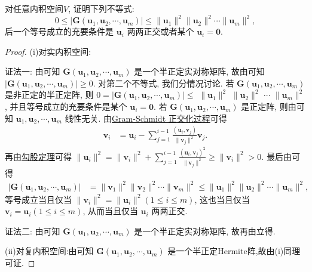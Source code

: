 \documentclass[../../main.tex]{subfiles}%
\begin{document}
\begin{proposition}\label{proposition:例9.16}
对任意内积空间$V$,
证明下列不等式:
\[
0 \leqslant  |\boldsymbol{G}(\boldsymbol{u}_1,\boldsymbol{u}_2,\cdots,\boldsymbol{u}_m)| \leqslant  \|\boldsymbol{u}_1\|^2\|\boldsymbol{u}_2\|^2\cdots\|\boldsymbol{u}_m\|^2,
\]
后一个等号成立的充要条件是 $\boldsymbol{u}_i$ 两两正交或者某个 $\boldsymbol{u}_i = \boldsymbol{0}$.
\end{proposition}
\begin{proof}
(i)对实内积空间:

{\color{blue}证法一:}
由可知 $\boldsymbol{G}(\boldsymbol{u}_1,\boldsymbol{u}_2,\cdots,\boldsymbol{u}_m)$ 是一个半正定实对称矩阵, 故由可知 $|\boldsymbol{G}(\boldsymbol{u}_1,\boldsymbol{u}_2,\cdots,\boldsymbol{u}_m)| \geqslant  0$. 对第二个不等式, 我们分情况讨论. 若 $\boldsymbol{G}(\boldsymbol{u}_1,\boldsymbol{u}_2,\cdots,\boldsymbol{u}_m)$ 是非正定的半正定阵, 则 $0 = |\boldsymbol{G}(\boldsymbol{u}_1,\boldsymbol{u}_2,\cdots,\boldsymbol{u}_m)| \leqslant $   $\|\boldsymbol{u}_1\|^2$  $\|\boldsymbol{u}_2\|^2$ $\cdots$ $\|\boldsymbol{u}_m\|^2$, 并且等号成立的充要条件是某个 $\boldsymbol{u}_i = \boldsymbol{0}$. 若 $\boldsymbol{G}(\boldsymbol{u}_1,\boldsymbol{u}_2,\cdots,\boldsymbol{u}_m)$ 是正定阵, 则由可知 $\boldsymbol{u}_1,\boldsymbol{u}_2,\cdots,\boldsymbol{u}_m$ 线性无关. 由\hyperref[theorem:Gram-Schmidt正交化方法]{Gram-Schmidt 正交化过程}可得
\begin{align*}
\boldsymbol{v}_i &= \boldsymbol{u}_i - \sum_{j = 1}^{i - 1} \frac{(\boldsymbol{u}_i,\boldsymbol{v}_j)}{\|\boldsymbol{v}_j\|^2} \boldsymbol{v}_j.
\end{align*}
再由\hyperref[corollary:范数性质的相关推广-勾股定理]{勾股定理}可得 $\|\boldsymbol{u}_i\|^2 = \|\boldsymbol{v}_i\|^2 + \sum_{j = 1}^{i - 1} \frac{(\boldsymbol{u}_i,\boldsymbol{v}_j)^2}{\|\boldsymbol{v}_j\|^2} \geqslant  \|\boldsymbol{v}_i\|^2 > 0$. 最后由可得
\begin{align*}
|\boldsymbol{G}(\boldsymbol{u}_1,\boldsymbol{u}_2,\cdots,\boldsymbol{u}_m)| &= \|\boldsymbol{v}_1\|^2\|\boldsymbol{v}_2\|^2\cdots\|\boldsymbol{v}_m\|^2 \leqslant  \|\boldsymbol{u}_1\|^2\|\boldsymbol{u}_2\|^2\cdots\|\boldsymbol{u}_m\|^2,
\end{align*}
等号成立当且仅当 $\|\boldsymbol{v}_i\|^2 = \|\boldsymbol{u}_i\|^2 (1 \leqslant  i \leqslant  m)$, 这也当且仅当 $\boldsymbol{v}_i = \boldsymbol{u}_i (1 \leqslant  i \leqslant  m)$, 从而当且仅当 $\boldsymbol{u}_i$ 两两正交.

{\color{blue}证法二:}
由可知 $\boldsymbol{G}(\boldsymbol{u}_1,\boldsymbol{u}_2,\cdots,\boldsymbol{u}_m)$ 是一个半正定实对称矩阵, 故再由立得.

(ii)对复内积空间:由可知 $\boldsymbol{G}(\boldsymbol{u}_1,\boldsymbol{u}_2,\cdots,\boldsymbol{u}_m)$ 是一个半正定Hermite阵,故由(i)同理可证.
\end{proof}
\end{document}
